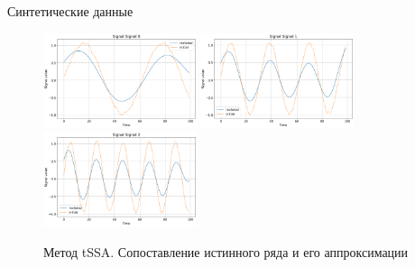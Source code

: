 \begin{frame}{Синтетические данные}
{			\begin{figure}
				\includegraphics[width=0.4\textwidth, keepaspectratio]{img/tssa_sines_compar1.png}
				\includegraphics[width=0.4\textwidth, keepaspectratio]{img/tssa_sines_compar2.png}
				\includegraphics[width=0.4\textwidth, keepaspectratio]{img/tssa_sines_compar3.png}
				\caption{Метод tSSA. Сопоставление истинного ряда и его аппроксимации}
			\end{figure}
			
		}
		
	\end{frame}
	
